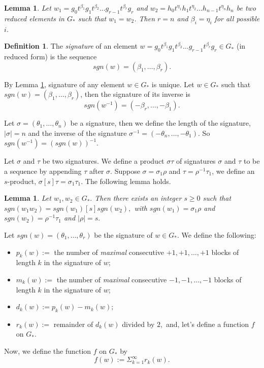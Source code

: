 \documentclass[12pt]{amsart}
\newtheorem{lemma}[theorem]{Lemma}
\theoremstyle{definition}
\newtheorem{definition}[theorem]{Definition}
\theoremstyle{remark}
\numberwithin{equation}{subsection}
\theoremstyle{plain}
\numberwithin{equation}{section}
\begin{document}
 \begin{lemma}\cite[Lemma~3]{bardakov1997width}\label{uniHNN}
     Let $w_1 = g_0t^{\beta_1}g_1t^{\beta_2}\ldots g_{r-1}t^{\beta_{r}}g_r$ and $w_2 = h_0t^{\eta_1}h_1t^{\eta_2}\ldots h_{n-1}t^{\eta_{n}}h_n$ be two reduced elements in $G_*$ such that $w_1 = w_2$. Then $r=n$ and $\beta_i = \eta_i$ for all possible $i$.
 \end{lemma}

\begin{definition}
    The {\it signature} of an element $w = g_0t^{\beta_1}g_1t^{\beta_2}\ldots g_{r-1}t^{\beta_{r}}g_r \in G_*$ (in reduced form) is the sequence $$sgn(w) =  (\beta_1,\ldots ,\beta_r).$$ 
\end{definition}

 By Lemma \ref{uniHNN}, signature of any element $w \in G_*$ is unique. Let $w \in G_*$ such that $sgn(w) = (\beta_1,\ldots ,\beta_r)$, then the signature of its inverse is $$sgn(w^{-1}) = (-\beta_r,\ldots , -\beta_1) .$$ 
 
 Let $\sigma = (\theta_1,\ldots , \theta_n)$ be a signature, then we define the length of the signature, $|\sigma| = n$ and the inverse of the signature $\sigma^{-1} = (-\theta_n,\ldots ,-\theta_1).$ So $sgn(w^{-1}) = (sgn(w))^{-1}.$ 

Let $\sigma$ and $\tau$ be two signatures. We define a product $\sigma\tau$ of signatures $\sigma$ and $\tau$ to be a sequence by appending $\tau$ after $\sigma$. Suppose $\sigma = \sigma_1\rho$ and $\tau = \rho^{-1}\tau_1$, we define an $s$-product, $\sigma[s]\tau = \sigma_1\tau_1$. The following lemma holds.

\begin{lemma}\cite[Lemma~4]{bardakov1997width}
Let $w_1,w_2 \in G_*.$ Then there exists an integer $s \geq 0$ such that $sgn(w_1w_2) = sgn(w_1)[s]sgn(w_2),$ with $sgn(w_1) = \sigma_1\rho$ and $sgn(w_2) = \rho^{-1}\tau_1$ and $|\rho| = s.$
\end{lemma}

Let $sgn(w) = (\theta_1,\ldots , \theta_r)$ be the signature of $w \in G_*.$ We define the following:
\begin{itemize}
    \item $p_k(w) :=$ the number of \emph{maximal} consecutive 
    $+1,+1,\ldots,+1$ blocks of length $k$ in the signature of $w$;
    
    \item $m_k(w) :=$ the number of \emph{maximal} consecutive 
    $-1,-1,\ldots,-1$ blocks of length $k$ in the signature of $w$;
    
    \item $d_k(w) := p_k(w) - m_k(w);$
    \item $r_k(w) := $ remainder of $d_k(w)$ divided by $2,$ and, let's define a function $f$ on $G_*$.
\end{itemize}
Now, we define the function $f$ on $G_*$ by
$$f(w) := \Sigma_{k=1}^{\infty} r_k(w).$$
\end{document}
